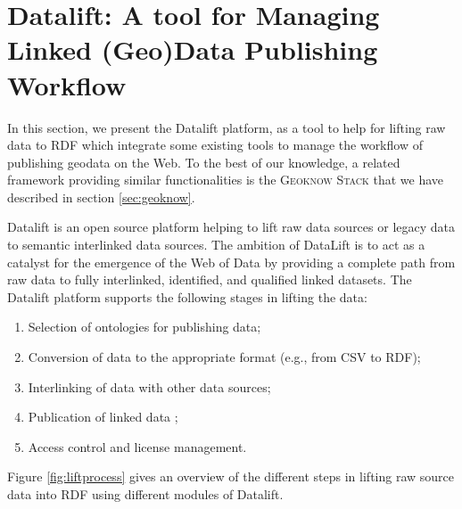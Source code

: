 
\section{Datalift: A tool for Managing Linked (Geo)Data Publishing Workflow}
\label{sec:toolLD}
In this section, we present the Datalift platform, as a tool to help for lifting raw data to RDF which integrate some existing tools to manage the workflow of publishing geodata on the Web. To the best of our knowledge, a related framework providing similar functionalities is the \textsc{Geoknow Stack} that we have described in section \ref{sec:geoknow}.


Datalift is an open source platform \cite{scharffe_2012} helping to lift raw data sources or legacy data to semantic interlinked data sources.
The ambition of DataLift is to act as a catalyst for the emergence of the Web of Data by providing a complete path from raw data to fully interlinked, identified, and qualified linked datasets. The Datalift platform supports the following stages in lifting the data:
\begin{enumerate}
\item Selection of ontologies for publishing data;
\item Conversion of data to the appropriate format (e.g., from CSV to RDF);
\item Interlinking of data with other data sources;
\item Publication of linked data ;
\item Access control and license management.
\end{enumerate}

Figure \ref{fig:liftprocess} gives an overview of the different steps in lifting raw source data into RDF using different modules of Datalift.

